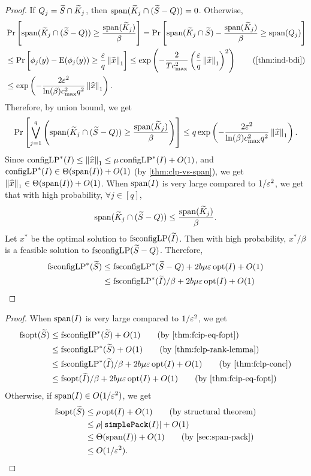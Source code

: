 \begin{proof}
If $Q_j = \widetilde{S} \cap \widetilde{K}_j$, then $\operatorname{span}(\widetilde{K}_j \cap (\widetilde{S} - Q)) = 0$.
Otherwise,
\begin{align*}
& \Pr\left[ \Span(\Ktild_j \cap (\Stild - Q)) \ge \frac{\Span(\Ktild_j)}{\beta} \right]
= \Pr\left[ \Span(\Ktild_j \cap \Stild) - \frac{\Span(\Ktild_j)}{\beta} \ge \Span(Q_j) \right]
\\ &\le \Pr\left[ \phi_j(y) - \E(\phi_j(y)) \ge \frac{\epsLP}{q} \norm{\widehat{x}}_1 \right]
\le \exp\left( -\frac{2}{Tc_{\max}^2} \left(\frac{\epsLP}{q}\norm{\widehat{x}}_1\right)^2\right)
\tag{\cref{thm:ind-bdi}}
\\ &\le \exp\left( -\frac{2\epsLP^2}{\ln(\beta)c_{\max}^2q^2} \norm{\widehat{x}}_1\right).
\end{align*}
Therefore, by union bound, we get
\[ \Pr\left[ \bigvee_{j=1}^q \left(\operatorname{span}(\widetilde{K}_j \cap (\widetilde{S} - Q))
    \ge \frac{\operatorname{span}(\widetilde{K}_j)}{\beta}\right) \right]
\le q\exp\left( -\frac{2\varepsilon^2}{\ln(\beta)c_{\max}^2q^2} \left\lVert \widehat{x} \right\rVert_1\right). \]
Since $\operatorname{configLP}^*(I) \le \left\lVert \widehat{x} \right\rVert_1 \le \mu \operatorname{configLP}^*(I) + O(1)$,
and $\operatorname{configLP}^*(I) \in \Theta(\operatorname{span}(I)) + O(1)$ (by \cref{thm:clp-vs-span}),
we get $\left\lVert \widehat{x} \right\rVert_1 \in \Theta(\operatorname{span}(I)) + O(1)$.
When $\operatorname{span}(I)$ is very large compared to $1/\varepsilon^2$, we get
that with high probability, $\forall j \in [q]$,
\[ \operatorname{span}(\widetilde{K}_j \cap (\widetilde{S} - Q)) \le \frac{\operatorname{span}(\widetilde{K}_j)}{\beta}. \]
Let $x^*$ be the optimal solution to $\operatorname{fsconfigLP}(\widetilde{I})$.
Then with high probability, $x^*/\beta$ is a feasible solution to $\operatorname{fsconfigLP}(\widetilde{S} - Q)$.
Therefore,
\begin{align*}
\operatorname{fsconfigLP}^*(\widetilde{S})
&\le \operatorname{fsconfigLP}^*(\widetilde{S} - Q) + 2b\mu\varepsilon \operatorname{opt}(I) + O(1)
\\ &\le \operatorname{fsconfigLP}^*(\widetilde{I})/\beta + 2b\mu\varepsilon \operatorname{opt}(I) + O(1)
\qedhere \end{align*}
\end{proof}

\rthmFoptConc*
\begin{proof}
When $\operatorname{span}(I)$ is very large compared to $1/\varepsilon^2$, we get
\begin{align*}
\fsopt(\Stild) &\le \fscIP^*(\Stild) + O(1)  \tag{by \cref{thm:fcip-eq-fopt}}
\\ &\le \fscLP^*(\Stild) + O(1)  \tag{by \cref{thm:fclp-rank-lemma}}
\\ &\le \fscLP^*(\Itild)/\beta + 2b\mu\epsLP \opt(I) + O(1)  \tag{by \cref{thm:fclp-conc}}
\\ &\le \fsopt(\Itild)/\beta + 2b\mu\epsLP \opt(I) + O(1)  \tag{by \cref{thm:fcip-eq-fopt}}
\end{align*}
Otherwise, if $\operatorname{span}(I) \in O(1/\varepsilon^2)$, we get
\begin{align*}
\fsopt(\Stild) &\le \rho\opt(I) + O(1)  \tag{by structural theorem}
\\ &\le \rho|\simplePack(I)| + O(1)
\\ &\le \Theta(\Span(I)) + O(1)  \tag{by \cref{sec:span-pack}}
\\ &\le O(1/\epsLP^2).  \qedhere
\end{align*}
\end{proof}

